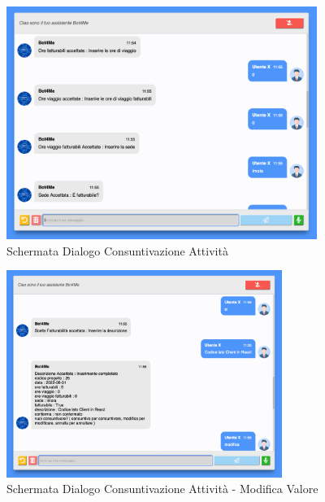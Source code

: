 \begin{figure}[H]
    \centering\includegraphics[width=0.9\textwidth, height=0.7\textheight, keepaspectratio]{images/schermata_consultivazione_2.png}
    \caption{Schermata Dialogo Consuntivazione Attività}
\end{figure}

\begin{figure}[H]
    \centering\includegraphics[width=0.8\textwidth, height=0.7\textheight, keepaspectratio]{images/schermata_consultivazione_3.png}
    \caption{Schermata Dialogo Consuntivazione Attività - Modifica Valore}
\end{figure}

